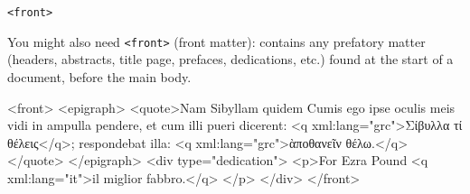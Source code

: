 \begin{frame}[fragile]{\texttt{<front>}}

You might also need \texttt{<front>} (front matter): contains any prefatory matter (headers, abstracts, title page, prefaces, dedications, etc.) found at the start of a document, before the main body. 

\begin{xmlcode}
<front>
 <epigraph>
  <quote>Nam Sibyllam quidem Cumis ego ipse oculis meis vidi in ampulla
     pendere, et cum illi pueri dicerent: <q xml:lang="grc">Σίβυλλα τί
       θέλεις</q>; respondebat illa: <q xml:lang="grc">ὰποθανεῖν θέλω.</q>
  </quote>
 </epigraph>
 <div type="dedication">
  <p>For Ezra Pound <q xml:lang="it">il miglior fabbro.</q>
  </p>
 </div>
</front>
\end{xmlcode}

\end{frame}



